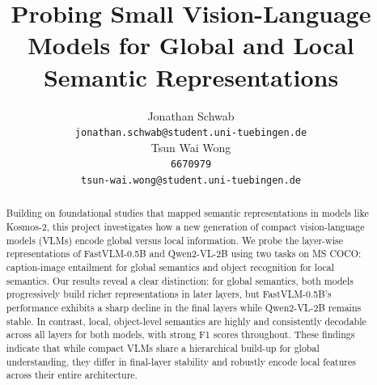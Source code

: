 \documentclass[11pt]{article}
\title{Probing Small Vision-Language
Models for Global and Local Semantic
Representations}
\author{Jonathan Schwab \\
  {\small\texttt{jonathan.schwab@student.uni-tuebingen.de}} \\\And
  Tsun Wai Wong \\
  {\small\texttt{6670979}} \\
  {\small\texttt{tsun-wai.wong@student.uni-tuebingen.de}} \\}
\begin{document}
\maketitle
\begin{abstract}
Building on foundational studies that mapped semantic representations in models like Kosmos-2, this project investigates how a new generation of compact vision-language models (VLMs) encode global versus local information. We probe the layer-wise representations of FastVLM-0.5B and Qwen2-VL-2B using two tasks on MS COCO: caption-image entailment for global semantics and object recognition for local semantics. Our results reveal a clear distinction: for global semantics, both models progressively build richer representations in later layers, but FastVLM-0.5B's performance exhibits a sharp decline in the final layers while Qwen2-VL-2B remains stable. In contrast, local, object-level semantics are highly and consistently decodable across all layers for both models, with strong F1 scores throughout. These findings indicate that while compact VLMs share a hierarchical build-up for global understanding, they differ in final-layer stability and robustly encode local features across their entire architecture.
\end{abstract}
\end{document}
